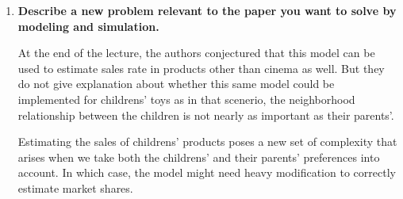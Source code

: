 \documentclass[article, 11pt, a4paper, oneside]{memoir}
\begin{document}
\begin{enumerate}[left=0pt, itemsep=20pt, label={\(\square\)}]
    \item \textbf{Describe a new problem relevant to the paper you want to solve by
        modeling and simulation.}

        At the end of the lecture, the authors conjectured that this model can be used to estimate sales rate in products other than cinema as well. But they do not give explanation about whether this same model could be implemented for childrens' toys as in that scenerio, the neighborhood relationship between the children is not nearly as important as their parents'. 

        Estimating the sales of childrens' products poses a new set of complexity that arises when we take both the childrens' and their parents' preferences into account. In which case, the model might need heavy modification to correctly estimate market shares.

\end{enumerate}
\end{document}
